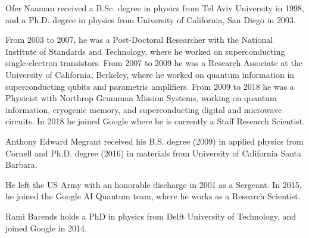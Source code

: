 \documentclass[journal]{IEEEtran}
\begin{document}
\begin{IEEEbiography}{Ofer Naaman} received a B.Sc. degree in physics from Tel Aviv University in 1998, and a Ph.D. degree in physics from University of California, San Diego in 2003. 

From 2003 to 2007, he was a Post-Doctoral Researcher with the National Institute of Standards and Technology, where he worked on superconducting single-electron transistors. From 2007 to 2009 he was a Research Associate at the University of California, Berkeley, where he worked on quantum information in superconducting qubits and parametric amplifiers. From 2009 to 2018 he was a Physicist with Northrop Grumman Mission Systems, working on quantum information, cryogenic memory, and superconducting digital and microwave circuits. In 2018 he joined Google where he is currently a Staff Research Scientist.
\end{IEEEbiography}
\begin{IEEEbiography}{Anthony Edward Megrant} received his B.S. degree (2009) in applied physics from Cornell and Ph.D. degree (2016) in materials from University of California Santa Barbara.  

He left the US Army with an honorable discharge in 2001 as a Sergeant.  In 2015, he joined the Google AI Quantum team, where he works as a Research Scientist. 


\end{IEEEbiography}
\begin{IEEEbiographynophoto}{Rami Barends} holds a PhD in physics from Delft University of Technology, and joined Google in 2014.\end{IEEEbiographynophoto}
\end{document}
